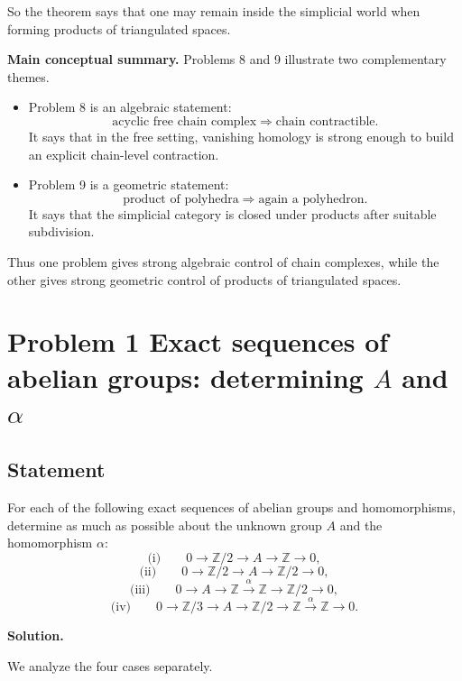 \documentclass[12pt,a4paper]{article}
\theoremstyle{notespace}
\begin{document}
So the theorem says that one may remain inside the simplicial world when forming products of triangulated spaces.

\bigskip

\textbf{Main conceptual summary.}
Problems 8 and 9 illustrate two complementary themes.

\begin{itemize}
	\item Problem 8 is an algebraic statement:
	\[
	\text{acyclic free chain complex} \Longrightarrow \text{chain contractible}.
	\]
	It says that in the free setting, vanishing homology is strong enough to build an explicit chain-level contraction.
	
	\item Problem 9 is a geometric statement:
	\[
	\text{product of polyhedra} \Longrightarrow \text{again a polyhedron}.
	\]
	It says that the simplicial category is closed under products after suitable subdivision.
\end{itemize}

Thus one problem gives strong algebraic control of chain complexes, while the other gives strong geometric control of products of triangulated spaces.

\section{Problem 1 Exact sequences of abelian groups: determining \(A\) and \(\alpha\)}

\subsection*{Statement}
For each of the following exact sequences of abelian groups and homomorphisms, determine as much as possible about the unknown group \(A\) and the homomorphism \(\alpha\):
\[
\text{(i)}\qquad 0 \longrightarrow \mathbb Z/2 \longrightarrow A \longrightarrow \mathbb Z \longrightarrow 0,
\]
\[
\text{(ii)}\qquad 0 \longrightarrow \mathbb Z/2 \longrightarrow A \longrightarrow \mathbb Z/2 \longrightarrow 0,
\]
\[
\text{(iii)}\qquad 0 \longrightarrow A \longrightarrow \mathbb Z \xrightarrow{\alpha} \mathbb Z \longrightarrow \mathbb Z/2 \longrightarrow 0,
\]
\[
\text{(iv)}\qquad 0 \longrightarrow \mathbb Z/3 \longrightarrow A \longrightarrow \mathbb Z/2 \longrightarrow \mathbb Z \xrightarrow{\alpha} \mathbb Z \longrightarrow 0.
\]

\textbf{Solution.}

We analyze the four cases separately.
\end{document}
